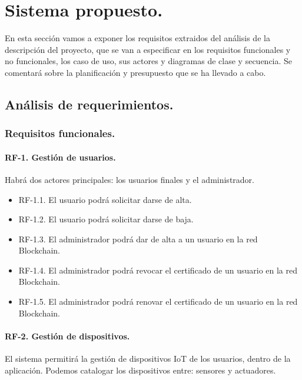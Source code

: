 \section{Sistema propuesto.}

En esta sección vamos a exponer los requisitos extraidos del análisis de la descripción del proyecto, que se van a 
especificar en los requisitos funcionales y no funcionales, los caso de uso, sus actores y diagramas de clase y secuencia.
Se comentará sobre la planificación y presupuesto que se ha llevado a cabo.

\subsection{Análisis de requerimientos.}

\subsubsection{Requisitos funcionales.}

\paragraph{RF-1. Gestión de usuarios.} Habrá dos actores principales: los usuarios finales y el administrador.

\begin{itemize}
    \item[] RF-1.1. El usuario podrá solicitar darse de alta.
    \item[] RF-1.2. El usuario podrá solicitar darse de baja.
    \item[] RF-1.3. El administrador podrá dar de alta a un usuario en la red Blockchain.
    \item[] RF-1.4. El administrador podrá revocar el certificado de un usuario en la red Blockchain.
    \item[] RF-1.5. El administrador podrá renovar el certificado de un usuario en la red Blockchain.
\end{itemize}

\paragraph{RF-2. Gestión de dispositivos.} El sistema permitirá la gestión de dispositivos IoT de los usuarios, dentro de 
la aplicación. Podemos catalogar los dispositivos entre: sensores y actuadores.

